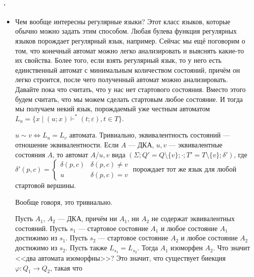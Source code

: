 \documentclass{article}
\begin{document}
    \paragraph{.}
    \begin{itemize}
        \item[]
        \begin{Comment}
            Чем вообще интересны регулярные языки? Этот класс языков, которые обычно можно задать этим способом. Любая булева функция регулярных языков порождает регулярный язык, например. Сейчас мы ещё поговорим о том, что конечный автомат можно легко анализировать и выяснять какие-то их свойства. Более того, если взять регулярный язык, то у него есть единственный автомат с минимальным количеством состояний, причём он легко строится, после чего полученный автомат можно анализировать.\\
            Давайте пока что считать, что у нас нет стартового состояния. Вместо этого будем считать, что мы можем сделать стартовым любое состояние. И тогда мы получаем некий язык, порождаемый уже честным автоматом $L_u=\{x\mid(u;x)\vdash^*(t;\varepsilon),t\in T\}$.
        \end{Comment}
        \dfn $u\sim v\Leftrightarrow L_u=L_v$  автомата.
        \thm Тривиально, эквивалентность состояний --- отношение эквивалентности.
        \thm Если $A$ --- ДКА, $u,v$ --- эквивалентные состояния $A$, то автомат $A/u,v$ вида $(\Sigma;Q'=Q\setminus\{v\};\cdot;T'=T\setminus\{v\};\delta')$, где $\delta'(p,c)=\begin{cases}
            \delta(p,c) & \delta(p,c)\neq v\\
            u & \delta(p,c)=v
        \end{cases}$ порождает тот же язык для любой стартовой вершины.
        \begin{Proof}
            Вообще говоря, это тривиально.
        \end{Proof}
        \thm Пусть $A_1$, $A_2$ --- ДКА, причём ни $A_1$, ни $A_2$ не содержат эквивалентных состояний. Пусть $s_1$ --- стартовое состояние $A_1$ и любое состояние $A_1$ достижимо из $s_1$. Пусть $s_2$ --- стартовое состояние $A_2$ и любое состояние $A_2$ достижимо из $s_2$. Пусть также $L_{s_1}=L_{s_2}$. Тогда $A_1$ изоморфен $A_2$.
        \dfn Что значит <<два автомата изоморфны>>? Это значит, что существует биекция $\varphi\colon Q_1\to Q_2$, такая что
        \begin{enumerate}

\end{enumerate}
\end{itemize}
\end{document}
